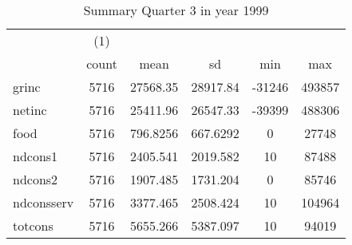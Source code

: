 \begin{table}[htbp]\centering
\def\sym#1{\ifmmode^{#1}\else\(^{#1}\)\fi}
\caption{Summary Quarter 3 in year 1999 \label{sum\_Q3\_y1999}}
\begin{tabular}{l*{1}{ccccc}}
\hline\hline
            &\multicolumn{1}{c}{(1)}&            &            &            &            \\
            &       count&        mean&          sd&         min&         max\\
\hline
grinc       &        5716&    27568.35&    28917.84&      -31246&      493857\\
netinc      &        5716&    25411.96&    26547.33&      -39399&      488306\\
food        &        5716&    796.8256&    667.6292&           0&       27748\\
ndcons1     &        5716&    2405.541&    2019.582&          10&       87488\\
ndcons2     &        5716&    1907.485&    1731.204&           0&       85746\\
ndconsserv  &        5716&    3377.465&    2508.424&          10&      104964\\
totcons     &        5716&    5655.266&    5387.097&          10&       94019\\
\hline\hline
\end{tabular}
\end{table}
